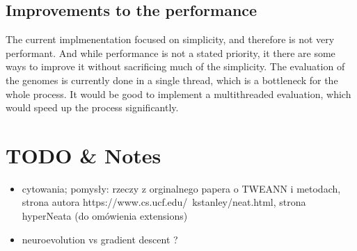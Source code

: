\documentclass{article}
\begin{document}
        \subsection{Improvements to the performance}
        The current implmenentation focused on simplicity, and therefore is not very performant. And while performance
        is not a stated priority, it there are some ways to improve it without sacrificing much of the simplicity.
        The evaluation of the genomes is currently done in a single thread, which is a bottleneck for the whole process.
        It would be good to implement a multithreaded evaluation, which would speed up the process significantly.
\section{TODO \& Notes}
\begin{itemize}
\item cytowania; pomysły: rzeczy z orginalnego papera o TWEANN i metodach, strona autora https://www.cs.ucf.edu/~kstanley/neat.html, strona hyperNeata (do omówienia extensions)
\item neuroevolution vs gradient descent ?
\end{itemize}

\end{document}

